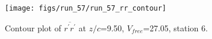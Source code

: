 \begin{figure}[H]
\centering
\texttt{[image: figs/run\_57/run\_57\_rr\_contour]}
\caption{Contour plot of $\overline{r^\prime r^\prime}$ at $z/c$=9.50, $V_{free}$=27.05, station 6.}
\label{fig:run_57_rr_contour}
\end{figure}


